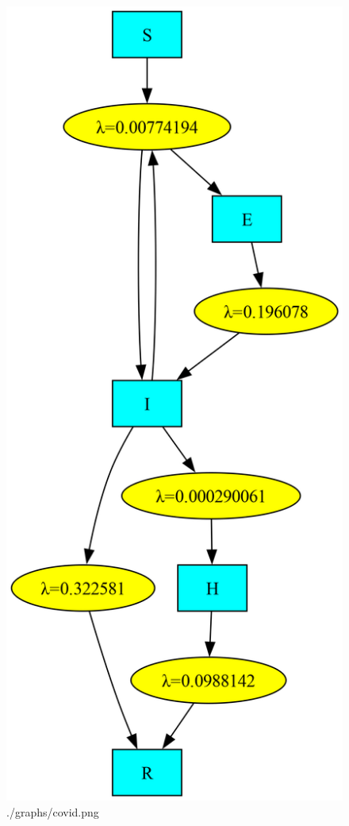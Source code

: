 \documentclass[a4paper]{article}
\begin{document}
  \begin{figure}[!htb]
    \centering
    \includegraphics[height=0.95\textheight]{./graphs/covid.png}
    \caption{./graphs/covid.png}
  \end{figure}
\end{document}
